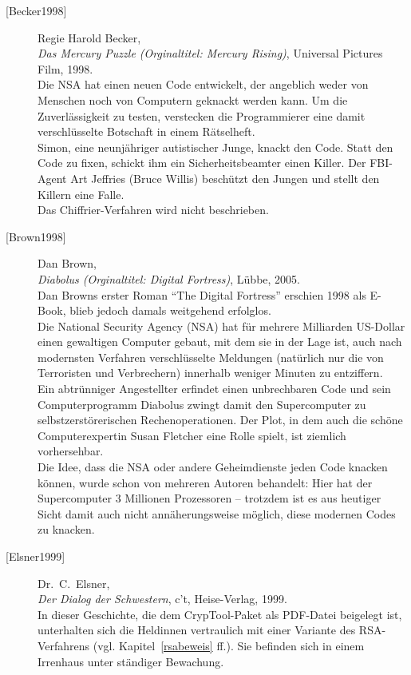 \begin{description}
\item[\textrm{[Becker1998]}] 
    Regie Harold Becker, \\
    {\em Das Mercury Puzzle (Orginaltitel: Mercury Rising)},
    Universal Pictures Film, 1998. \\
    Die NSA hat einen neuen Code entwickelt, der angeblich weder von Menschen
    noch von Computern geknackt werden kann. Um die Zuverlässigkeit zu testen,
    verstecken die Programmierer eine damit verschlüsselte Botschaft in
    einem Rätselheft.\\
    Simon, eine neunjähriger autistischer Junge, knackt den Code.
    Statt den Code zu fixen, schickt ihm ein Sicherheitsbeamter einen Killer.
    Der FBI-Agent Art Jeffries (Bruce Willis) beschützt den Jungen und
    stellt den Killern eine Falle.\\
    Das Chiffrier-Verfahren wird nicht beschrieben.\\


\item[\textrm{[Brown1998]}] 
    Dan Brown, \\
    {\em Diabolus (Orginaltitel: Digital Fortress)}, Lübbe, 2005. \\
    Dan Browns erster Roman "`The Digital Fortress"' erschien 1998 als E-Book,
    blieb jedoch damals weitgehend erfolglos.\\
    Die National Security Agency (NSA) hat für mehrere Milliarden US-Dollar
    einen gewaltigen Computer gebaut, mit dem sie in der Lage ist, auch nach
    modernsten Verfahren verschlüsselte Meldungen (natürlich nur die von
    Terroristen und Verbrechern) innerhalb weniger Minuten zu entziffern.\\
    Ein abtrünniger Angestellter erfindet einen unbrechbaren Code und
    sein Computerprogramm Diabolus zwingt damit den Supercomputer zu
    selbstzerstörerischen Rechenoperationen. Der Plot, in dem auch die
    schöne Computerexpertin Susan Fletcher eine Rolle spielt, ist ziemlich
    vorhersehbar.\\
    Die Idee, dass die NSA oder andere Geheimdienste jeden Code knacken
    können, wurde schon von mehreren Autoren behandelt: Hier hat der
    Supercomputer 3 Millionen Prozessoren -- trotzdem ist es aus heutiger
    Sicht damit auch nicht annäherungsweise möglich, diese modernen Codes
    zu knacken.\\


\item[\textrm{[Elsner1999]}] 
    Dr.~C.~Elsner, \\
    {\em Der Dialog der Schwestern}, c't, Heise-Verlag, 1999. \\
    In dieser Geschichte, die dem CrypTool-Paket als PDF-Datei
    beigelegt ist, unterhalten sich die Heldinnen vertraulich mit einer
    Variante des RSA-Verfahrens (vgl. Kapitel~\ref{rsabeweis} ff.).
    Sie befinden sich in einem Irrenhaus unter ständiger Bewachung.\\



\end{description}
